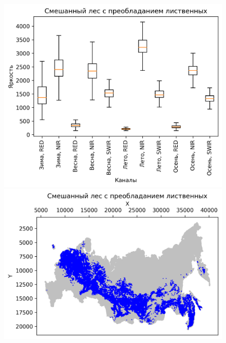\documentclass[14pt, a4paper, oneside]{extarticle}
\begin{document}
\begin{figure}[H]
    \centering
    \includegraphics[]{class-12-boxplot}
    \includegraphics[]{class-12-map}
\end{figure}
\end{document}
